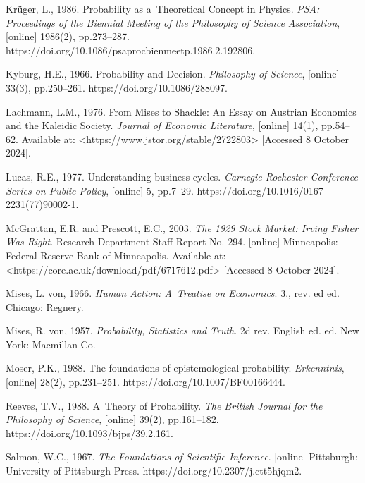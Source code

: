 Krüger, L., 1986. Probability as a~Theoretical Concept in Physics. \textit{PSA: Proceedings of the Biennial Meeting of the Philosophy of Science Association}, [online] 1986(2), pp.273–287. https://doi.org/10.1086/psaprocbienmeetp.1986.2.192806.



Kyburg, H.E., 1966. Probability and Decision. \textit{Philosophy of Science}, [online] 33(3), pp.250–261. https://doi.org/10.1086/288097.



Lachmann, L.M., 1976. From Mises to Shackle: An Essay on Austrian Economics and the Kaleidic Society. \textit{Journal of Economic Literature}, [online] 14(1), pp.54–62. Available at: {\textless}https://www.jstor.org/stable/2722803{\textgreater} [Accessed 8 October 2024].



Lucas, R.E., 1977. Understanding business cycles. \textit{Carnegie-Rochester Conference Series on Public Policy}, [online] 5, pp.7–29. https://doi.org/10.1016/0167-2231(77)90002-1.



McGrattan, E.R. and Prescott, E.C., 2003. \textit{The 1929 Stock Market: Irving Fisher Was Right}. Research Department Staff Report No. 294. [online] Minneapolis: Federal Reserve Bank of Minneapolis. Available at: {\textless}https://core.ac.uk/download/pdf/6717612.pdf{\textgreater} [Accessed 8 October 2024].



Mises, L. von, 1966. \textit{Human Action: A~Treatise on Economics}. 3., rev. ed ed. Chicago: Regnery.



Mises, R. von, 1957. \textit{Probability, Statistics and Truth}. 2d rev. English ed. ed. New York: Macmillan Co.



Moser, P.K., 1988. The foundations of epistemological probability. \textit{Erkenntnis}, [online] 28(2), pp.231–251. https://doi.org/10.1007/BF00166444.



Reeves, T.V., 1988. A~Theory of Probability. \textit{The British Journal for the Philosophy of Science}, [online] 39(2), pp.161–182. https://doi.org/10.1093/bjps/39.2.161.



Salmon, W.C., 1967. \textit{The Foundations of Scientific Inference}. [online] Pittsburgh: University of Pittsburgh Press. https://doi.org/10.2307/j.ctt5hjqm2.



